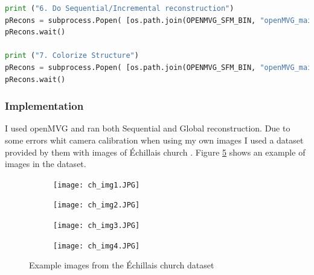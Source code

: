 \documentclass{article}
\begin{document}
    \begin{lstlisting}[language=python]
print ("6. Do Sequential/Incremental reconstruction")
pRecons = subprocess.Popen( [os.path.join(OPENMVG_SFM_BIN, "openMVG_main_SfM"), "--sfm_engine", "INCREMENTAL", "--input_file", matches_dir+"/sfm_data.json", "--match_dir", matches_dir, "--output_dir", reconstruction_dir] )
pRecons.wait()

print ("7. Colorize Structure")
pRecons = subprocess.Popen( [os.path.join(OPENMVG_SFM_BIN, "openMVG_main_ComputeSfM_DataColor"),  "-i", reconstruction_dir+"/sfm_data.bin", "-o", os.path.join(reconstruction_dir,"colorized.ply")] )
pRecons.wait()
    \end{lstlisting}

    \subsubsection{Implementation}
    I used openMVG \cite{moulon2016openmvg} and ran both Sequential and Global reconstruction. Due to some errors whit camera calibration when using my own images I used a dataset provided by them with images of Échillais church \cite{ImgDataSet}. Figure \ref{fig:exImg} shows an example of images in the dataset.
    \begin{figure}[H]
        \centering
        \begin{subfigure}{0.48\textwidth}
            \centering
            \texttt{[image: ch\_img1.JPG]}
            \label{fig:sub:exImg1}
        \end{subfigure}
        \hspace{5px}
        \begin{subfigure}{0.48\textwidth}
            \centering
            \texttt{[image: ch\_img2.JPG]}
            \label{fig:sub:exImg2}
        \end{subfigure}  
        \begin{subfigure}{0.48\textwidth}
            \centering
            \texttt{[image: ch\_img3.JPG]}
            \label{fig:sub:exImg3}
        \end{subfigure}
        \hspace{5px}
        \begin{subfigure}{0.48\textwidth}
            \centering
            \texttt{[image: ch\_img4.JPG]}
            \label{fig:sub:exImg4}
        \end{subfigure}   
        \caption{Example images from the Échillais church dataset\cite{ImgDataSet}}
        \label{fig:exImg}
    \end{figure}
\end{document}
